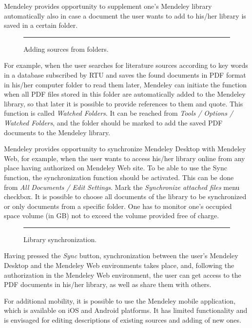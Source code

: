 Mendeley provides opportunity to supplement one’s Mendeley library automatically also in case a document the user wants to add to his/her library is saved in a certain folder.

\begin{figure}[ht]
  \centering
  \rule{0.8\linewidth}{0.35\linewidth}
  \caption{Adding sources from folders.}
  \label{fig:mend-watched-folders}
\end{figure}

For example, when the user searches for literature sources according to key words in a database subscribed by RTU and saves the found documents in PDF format in his/her computer folder to read them later, Mendeley can initiate the function when all PDF files stored in this folder are automatically added to the Mendeley library, so that later it is possible to provide references to them and quote. This function is called \emph{Watched Folders}. It can be reached from \emph{Tools / Options / Watched Folders}, and the folder should be marked to add the saved PDF documents to the Mendeley library.

Mendeley provides opportunity to synchronize Mendeley Desktop with Mendeley Web, for example, when the user wants to access his/her library online from any place having authorized on Mendeley Web site. To be able to use the Sync function, the synchronization function should be activated. This can be done from \emph{All Documents / Edit Settings}. Mark the \emph{Synchronize attached files} menu checkbox. It is possible to choose all documents of the library to be synchronized or only documents from a specific folder. One has to monitor one’s occupied space volume (in GB) not to exceed the volume provided free of charge.

\begin{figure}[ht]
  \centering
  \rule{0.8\linewidth}{0.35\linewidth}
  \caption{Library synchronization.}
  \label{fig:mend-sync}
\end{figure}

Having pressed the \emph{Sync} button, synchronization between the user’s Mendeley Desktop and the Mendeley Web environments takes place, and, following the authorization in the Mendeley Web environment, the user can get access to the PDF documents in his/her library, as well as share them with others.

For additional mobility, it is possible to use the Mendeley mobile application, which is available on iOS and Android platforms. It has limited functionality and is envisaged for editing descriptions of existing sources and adding of new ones.

